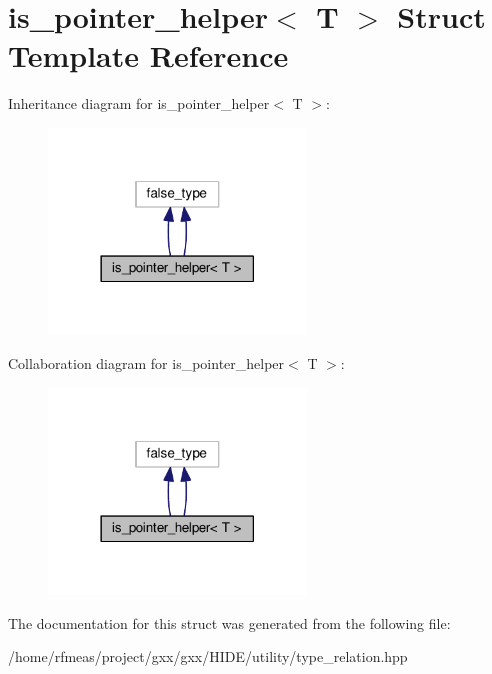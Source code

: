 \hypertarget{structis__pointer__helper}{}\section{is\+\_\+pointer\+\_\+helper$<$ T $>$ Struct Template Reference}
\label{structis__pointer__helper}


Inheritance diagram for is\+\_\+pointer\+\_\+helper$<$ T $>$\+:
\nopagebreak
\begin{figure}[H]
\begin{center}
\leavevmode
\includegraphics[width=194pt]{structis__pointer__helper__inherit__graph}
\end{center}
\end{figure}


Collaboration diagram for is\+\_\+pointer\+\_\+helper$<$ T $>$\+:
\nopagebreak
\begin{figure}[H]
\begin{center}
\leavevmode
\includegraphics[width=194pt]{structis__pointer__helper__coll__graph}
\end{center}
\end{figure}


The documentation for this struct was generated from the following file\+:\begin{DoxyCompactItemize}
\item 
/home/rfmeas/project/gxx/gxx/\+H\+I\+D\+E/utility/type\+\_\+relation.\+hpp\end{DoxyCompactItemize}
